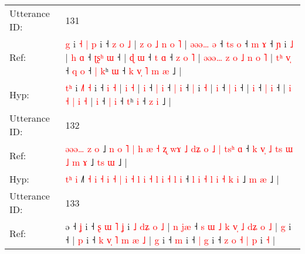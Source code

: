 \documentclass[10pt]{article}
\DeclareRobustCommand{\hl}[1]{{\textcolor{red}{#1}}}
\begin{document}
\begin{longtable}{ll}
 \\
\midrule
Utterance ID: & 131 \\
Ref: & \hl{}\hl{g} i \hl{˧}\hl{ }\hl{|} \hl{p} i ˧\hl{ }\hl{z} \hl{o} \hl{˩} |\hl{ }\hl{z}\hl{ }\hl{o}\hl{ }\hl{˩}\hl{ }\hl{n} \hl{o} \hl{˥} |\hl{ }\hl{ə}\hl{ə}\hl{ə}\hl{…} \hl{ə} ˧ \hl{t}\hl{s} \hl{o} ˧ \hl{m} \hl{ɤ} ˧ \hl{ɲ} i \hl{˩} |\hl{ }\hl{h} \hl{ɑ} ˧ \hl{ʈ}\hl{ʂ}\hl{ʰ} \hl{ɯ} ˧ |\hl{ }\hl{ɖ} \hl{ɯ} ˧ \hl{t} \hl{ɑ} ˧\hl{ }\hl{z}\hl{ }\hl{o}\hl{ }\hl{˥} |\hl{ }\hl{ə}\hl{ə}\hl{ə}\hl{…}\hl{ }\hl{z} \hl{o} \hl{˩} \hl{n} \hl{o} \hl{˥} |\hl{ }\hl{t}\hl{ʰ} \hl{v}\hl{̩} ˧ \hl{q} \hl{o} ˧\hl{ }\hl{|} \hl{k}ʰ \hl{ɯ} ˧\hl{ }\hl{k}\hl{ }\hl{v}\hl{̩}\hl{ }\hl{˥} \hl{m} \hl{æ} ˩ |
 \\
Hyp: & \hl{t}\hl{ʰ} i \hl{}\hl{˩}\hl{˥} \hl{˧} i ˧\hl{}\hl{} \hl{i} \hl{˧} |\hl{}\hl{}\hl{}\hl{}\hl{}\hl{}\hl{}\hl{} \hl{i} \hl{˧} |\hl{}\hl{}\hl{}\hl{}\hl{} \hl{i} ˧ \hl{}\hl{|} \hl{i} ˧ \hl{|} \hl{i} ˧ \hl{|} i \hl{˧} |\hl{}\hl{} \hl{i} ˧ \hl{}\hl{}\hl{|} \hl{i} ˧ |\hl{}\hl{} \hl{i} ˧ \hl{|} \hl{i} ˧\hl{}\hl{}\hl{}\hl{}\hl{}\hl{} |\hl{}\hl{}\hl{}\hl{}\hl{}\hl{}\hl{} \hl{i} \hl{˧} \hl{|} \hl{i} \hl{˧} |\hl{}\hl{}\hl{} \hl{}\hl{i} ˧ \hl{|} \hl{i} ˧\hl{}\hl{} \hl{t}ʰ \hl{i} ˧\hl{}\hl{}\hl{}\hl{}\hl{}\hl{}\hl{} \hl{z} \hl{i} ˩ |
 \\
\midrule
Utterance ID: & 132 \\
Ref: & \hl{ə}\hl{ə}\hl{ə}\hl{…}\hl{ }\hl{z} \hl{o} ˩\hl{ }\hl{n} \hl{o} \hl{˥} \hl{|} \hl{h} \hl{æ} \hl{˧} \hl{ʐ} \hl{w}\hl{ɤ} \hl{˩} \hl{d}\hl{ʑ} \hl{o} \hl{˩} \hl{|} \hl{t}\hl{s}\hl{ʰ} \hl{ɑ} ˧ \hl{k} \hl{v}\hl{̩} \hl{˩} \hl{t}\hl{s} \hl{ɯ} \hl{˩} \hl{m} \hl{ɤ} ˩ \hl{t}\hl{s} \hl{ɯ} ˩ |
 \\
Hyp: & \hl{}\hl{}\hl{}\hl{}\hl{t}\hl{ʰ} \hl{i} ˩\hl{}\hl{˥} \hl{˧} \hl{i} \hl{˧} \hl{i} \hl{˧} \hl{|} \hl{i} \hl{}\hl{˧} \hl{l} \hl{}\hl{i} \hl{˧} \hl{l} \hl{i} \hl{˧}\hl{ }\hl{l} \hl{i} ˧ \hl{l} \hl{}\hl{i} \hl{˧} \hl{}\hl{l} \hl{i} \hl{˧} \hl{k} \hl{i} ˩ \hl{}\hl{m} \hl{æ} ˩ |
 \\
\midrule
Utterance ID: & 133 \\
Ref: & ə ˧\hl{ }\hl{ʝ} i ˧\hl{ }\hl{ʂ}\hl{ }\hl{ɯ}\hl{ }\hl{˥}\hl{ }\hl{ʝ} i\hl{ }\hl{˩}\hl{ }\hl{d}\hl{ʑ}\hl{ }\hl{o} \hl{˩} |\hl{ }\hl{n} \hl{j}\hl{æ} ˧\hl{ }\hl{s}\hl{ }\hl{ɯ}\hl{ }\hl{˩}\hl{ }\hl{k}\hl{ }\hl{v}\hl{̩}\hl{ }\hl{˩} \hl{d}\hl{ʑ} \hl{o} \hl{˩} |\hl{ }\hl{g} i ˧ |\hl{ }\hl{p} i ˧ \hl{k} \hl{v}\hl{̩} \hl{˥} \hl{m} \hl{æ} \hl{˩} |\hl{ }\hl{g} i ˧ \hl{m} i ˧ \hl{|}\hl{ }\hl{g} i ˧ \hl{z}\hl{ }\hl{o} \hl{˧} \hl{|} \hl{p} i \hl{˧} |
 \\

\end{longtable}
\end{document}
